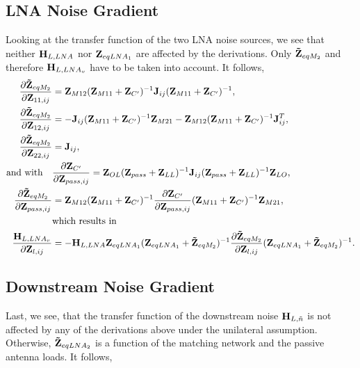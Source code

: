 \subsection{LNA Noise Gradient}
\label{sec:lna_noise_grad}

Looking at the transfer function of the two LNA noise sources, we see that neither $\mathbf{H}_{L,LNA}$ nor $\mathbf{Z}_{eqLNA_1}$ are affected by the derivations.
Only $\mathbf{\tilde{Z}}_{eqM_2}$ and therefore $\mathbf{H}_{L,LNA_v}$ have to be taken into account.
It follows,
\begin{align}
\label{eq:HLNAM_sig_grad}
\frac{\partial\mathbf{\tilde{Z}}_{eqM_2}}{\partial\mathbf{Z}_{11,ij}}&=
\mathbf{Z}_{M12}(\mathbf{Z}_{M11} + \mathbf{Z}_{C'})^{-1}\mathbf{J}_{ij}(\mathbf{Z}_{M11} + \mathbf{Z}_{C'})^{-1},\\
\frac{\partial\mathbf{\tilde{Z}}_{eqM_2}}{\partial\mathbf{Z}_{12,ij}}&=
-\mathbf{J}_{ij}(\mathbf{Z}_{M11} + \mathbf{Z}_{C'})^{-1}\mathbf{Z}_{M21} - \mathbf{Z}_{M12}(\mathbf{Z}_{M11} + \mathbf{Z}_{C'})^{-1}\mathbf{J}_{ij}^T,\\
\frac{\partial\mathbf{\tilde{Z}}_{eqM_2}}{\partial\mathbf{Z}_{22,ij}}&=\mathbf{J}_{ij},\\\nonumber
\text{and with}\quad&\frac{\partial\mathbf{Z}_{C'}}{\partial\mathbf{Z}_{pass,ij}} = 
\mathbf{Z}_{OL}(\mathbf{Z}_{pass}+\mathbf{Z}_{LL})^{-1}\mathbf{J}_{ij}(\mathbf{Z}_{pass}+\mathbf{Z}_{LL})^{-1}\mathbf{Z}_{LO},\\
\frac{\partial\mathbf{\tilde{Z}}_{eqM_2}}{\partial\mathbf{Z}_{pass,ij}}&=
\mathbf{Z}_{M12}(\mathbf{Z}_{M11} + \mathbf{Z}_{C'})^{-1}\frac{\partial\mathbf{Z}_{C'}}{\partial\mathbf{Z}_{pass,ij}}(\mathbf{Z}_{M11} + \mathbf{Z}_{C'})^{-1}\mathbf{Z}_{M21},\\\nonumber\qquad&\text{which results in}\\
\frac{\mathbf{H}_{L,LNA_v}}{\partial\mathbf{Z}_{l,ij}}&=-\mathbf{H}_{L,LNA}\mathbf{Z}_{eqLNA_1}(\mathbf{Z}_{eqLNA_1} + \mathbf{\tilde{Z}}_{eqM_2})^{-1}\frac{\partial\mathbf{\tilde{Z}}_{eqM_2}}{\partial\mathbf{Z}_{l,ij}}(\mathbf{Z}_{eqLNA_1} + \mathbf{\tilde{Z}}_{eqM_2})^{-1}.
\label{eq:HLNAM_sig_grad_22}
\end{align}


\subsection{Downstream Noise Gradient}
\label{sec:down_noise_grad}
Last, we see, that the transfer function of the downstream noise $\mathbf{H}_{L,\tilde{n}}$ is not affected by any of the derivations above under the unilateral assumption.
Otherwise, $\mathbf{\tilde{Z}}_{eqLNA_2}$ is a function of the matching network and the passive antenna loads. It follows,

